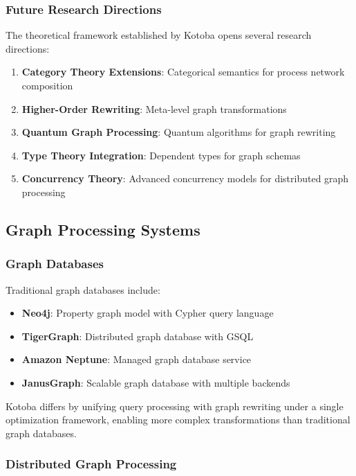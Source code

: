 \documentclass[11pt,a4paper]{article}
\begin{document}
\subsubsection{Future Research Directions}
\label{subsubsec:future_theory}

The theoretical framework established by Kotoba opens several research directions:

\begin{enumerate}
\item \textbf{Category Theory Extensions}: Categorical semantics for process network composition
\item \textbf{Higher-Order Rewriting}: Meta-level graph transformations
\item \textbf{Quantum Graph Processing}: Quantum algorithms for graph rewriting
\item \textbf{Type Theory Integration}: Dependent types for graph schemas
\item \textbf{Concurrency Theory}: Advanced concurrency models for distributed graph processing
\end{enumerate}

\subsection{Graph Processing Systems}
\label{subsec:graph_systems}

\subsubsection{Graph Databases}
\label{subsubsec:graph_databases}

Traditional graph databases include:
\begin{itemize}
\item \textbf{Neo4j}: Property graph model with Cypher query language
\item \textbf{TigerGraph}: Distributed graph database with GSQL
\item \textbf{Amazon Neptune}: Managed graph database service
\item \textbf{JanusGraph}: Scalable graph database with multiple backends
\end{itemize}

Kotoba differs by unifying query processing with graph rewriting under a single optimization framework, enabling more complex transformations than traditional graph databases.

\subsubsection{Distributed Graph Processing}
\label{subsubsec:distributed_graph}
\end{document}

